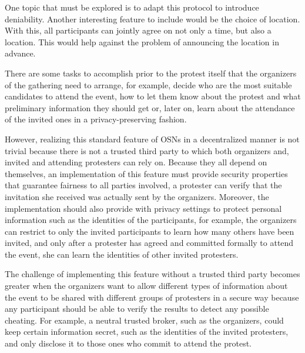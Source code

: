 One topic that must be explored is to adapt this protocol to introduce 
deniability.
Another interesting feature to include would be the choice of location.
With this, all participants can jointly agree on not only a time, but also 
a location.
This would help against the problem of announcing the location in advance.

There are some tasks to accomplish prior to the protest itself that the organizers 
of the gathering need to arrange, for example, decide who are the most suitable 
candidates to attend the event, how to let them know about the protest and what 
preliminary information they should get or, later on, learn about the attendance of 
the invited ones in a privacy-preserving fashion.

However, realizing this standard feature of OSNs in a decentralized manner is not trivial 
because there is not a trusted third party to which both organizers and, invited and 
attending protesters can rely on. Because they all depend on themselves, an 
implementation of this feature must provide security properties that guarantee fairness 
to all parties involved, \eg a protester can verify that the invitation she received 
was actually sent by the organizers. Moreover, the implementation should also provide 
with privacy settings to protect personal information such as the identities of 
the participants, for example, the organizers can restrict to only the invited participants 
to learn how many others have been invited, and only after a protester has agreed 
and committed formally to attend the event, she can learn the identities of other 
invited protesters.

The challenge of implementing this feature without a trusted third party becomes 
greater when the organizers want to allow different types of information about the 
event to be shared with different groups of protesters in a secure way because any 
participant should be able to verify the results to detect any possible cheating. 
For example, a neutral trusted broker, such as the organizers, could keep certain 
information secret, such as the identities of the invited protesters, and only disclose 
it to those ones who commit to attend the protest. 


